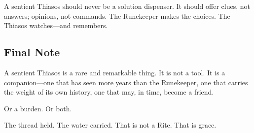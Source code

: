 A sentient Thiasos should never be a solution dispenser. It should offer clues, not answers; opinions, not commands. The Runekeeper makes the choices. The Thiasos watches—and remembers.

\subsection{Final Note}

A sentient Thiasos is a rare and remarkable thing. It is not a tool. It is a companion—one that has seen more years than the Runekeeper, one that carries the weight of its own history, one that may, in time, become a friend.

Or a burden. Or both.

The thread held. The water carried. That is not a Rite. That is grace.
